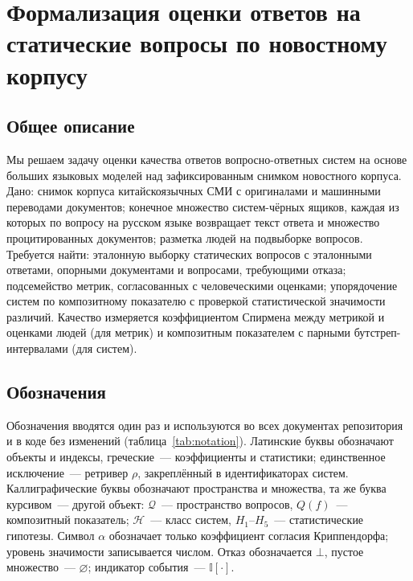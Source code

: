 \documentclass{article}
\newcommand{\I}{\mathbb{I}}                         %
\newcommand{\refuse}{\bot}                          %
\begin{document}
\section{Формализация оценки ответов на статические вопросы по новостному корпусу}\label{sec:prelim}

\subsection{Общее описание}

Мы решаем задачу оценки качества ответов вопросно-ответных систем на основе больших языковых моделей над зафиксированным снимком новостного корпуса. Дано: снимок корпуса китайскоязычных СМИ с оригиналами и машинными переводами документов; конечное множество систем-чёрных ящиков, каждая из которых по вопросу на русском языке возвращает текст ответа и множество процитированных документов; разметка людей на подвыборке вопросов. Требуется найти: эталонную выборку статических вопросов с эталонными ответами, опорными документами и вопросами, требующими отказа; подсемейство метрик, согласованных с человеческими оценками; упорядочение систем по композитному показателю с проверкой статистической значимости различий. Качество измеряется коэффициентом Спирмена между метрикой и оценками людей (для метрик) и композитным показателем с парными бутстреп-интервалами (для систем).

\subsection{Обозначения}

Обозначения вводятся один раз и используются во всех документах репозитория и в коде без изменений (таблица~\ref{tab:notation}). Латинские буквы обозначают объекты и индексы, греческие~--- коэффициенты и статистики; единственное исключение~--- ретривер $\rho$, закреплённый в идентификаторах систем. Каллиграфические буквы обозначают пространства и множества, та же буква курсивом~--- другой объект: $\mathcal{Q}$~--- пространство вопросов, $Q(f)$~--- композитный показатель; $\mathcal{H}$~--- класс систем, $H_1$--$H_5$~--- статистические гипотезы. Символ $\alpha$ обозначает только коэффициент согласия Криппендорфа; уровень значимости записывается числом. Отказ обозначается $\refuse$, пустое множество~--- $\varnothing$; индикатор события~--- $\I[\cdot]$.
\end{document}
